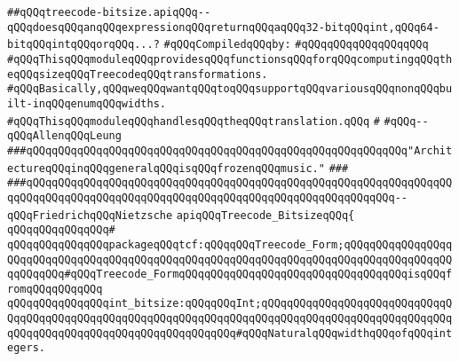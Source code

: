\label{src/lib/compiler/back/low/treecode/treecode-bitsize.api}
\verb|##qQQqtreecode-bitsize.apiqQQq--qQQqdoesqQQqanqQQqexpressionqQQqreturnqQQqaqQQq32-bitqQQqint,qQQq64-bitqQQqintqQQqorqQQq...?|\newline
\newline
\verb|#qQQqCompiledqQQqby:|\newline
\verb|#qQQqqQQqqQQqqQQqqQQq|\newline
\newline
\verb|#qQQqThisqQQqmoduleqQQqprovidesqQQqfunctionsqQQqforqQQqcomputingqQQqtheqQQqsizeqQQqTreecodeqQQqtransformations.|\newline
\verb|#qQQqBasically,qQQqweqQQqwantqQQqtoqQQqsupportqQQqvariousqQQqnonqQQqbuilt-inqQQqenumqQQqwidths.|\newline
\verb|#qQQqThisqQQqmoduleqQQqhandlesqQQqtheqQQqtranslation.qQQq|\newline
\verb|#|\newline
\verb|#qQQq--qQQqAllenqQQqLeung|\newline
\newline
\newline
\newline
\verb|###qQQqqQQqqQQqqQQqqQQqqQQqqQQqqQQqqQQqqQQqqQQqqQQqqQQqqQQqqQQq"ArchitectureqQQqinqQQqgeneralqQQqisqQQqfrozenqQQqmusic."|\newline
\verb|###|\newline
\verb|###qQQqqQQqqQQqqQQqqQQqqQQqqQQqqQQqqQQqqQQqqQQqqQQqqQQqqQQqqQQqqQQqqQQqqQQqqQQqqQQqqQQqqQQqqQQqqQQqqQQqqQQqqQQqqQQqqQQqqQQqqQQqqQQq--qQQqFriedrichqQQqNietzsche|\newline
\newline
\newline
\newline
\verb|apiqQQqTreecode_BitsizeqQQq{|\newline
\verb|qQQqqQQqqQQqqQQq#|\newline
\verb|qQQqqQQqqQQqqQQqpackageqQQqtcf:qQQqqQQqTreecode_Form;qQQqqQQqqQQqqQQqqQQqqQQqqQQqqQQqqQQqqQQqqQQqqQQqqQQqqQQqqQQqqQQqqQQqqQQqqQQqqQQqqQQqqQQqqQQqqQQq#qQQqTreecode_FormqQQqqQQqqQQqqQQqqQQqqQQqqQQqqQQqqQQqisqQQqfromqQQqqQQqqQQq|\newline
\newline
\verb|qQQqqQQqqQQqqQQqint_bitsize:qQQqqQQqInt;qQQqqQQqqQQqqQQqqQQqqQQqqQQqqQQqqQQqqQQqqQQqqQQqqQQqqQQqqQQqqQQqqQQqqQQqqQQqqQQqqQQqqQQqqQQqqQQqqQQqqQQqqQQqqQQqqQQqqQQqqQQqqQQqqQQqqQQq#qQQqNaturalqQQqwidthqQQqofqQQqintegers.|\newline
